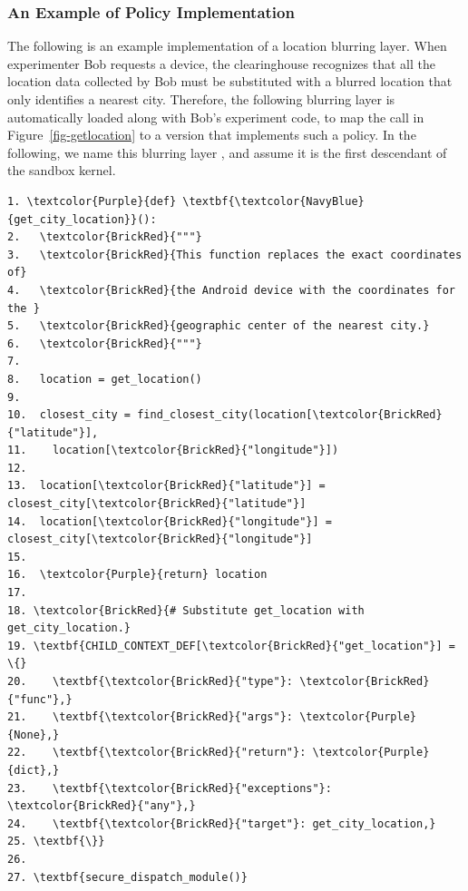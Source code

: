 \subsubsection{An Example of Policy Implementation}
\label{sec-precision-example}


The following is an example implementation of a location blurring layer. 
When experimenter Bob requests a device, the clearinghouse recognizes that all the location data
collected by Bob must be substituted with a blurred location that only identifies a nearest city.
Therefore, the following blurring layer is
automatically loaded along with Bob's experiment code, to map 
the  call in Figure~\ref{fig-getlocation} to a version 
that implements such a policy. In the following, we name this
blurring layer , and assume it is the first descendant
of the sandbox kernel.

\begin{Verbatim}
1. \textcolor{Purple}{def} \textbf{\textcolor{NavyBlue}{get_city_location}}():
2.   \textcolor{BrickRed}{"""}
3.   \textcolor{BrickRed}{This function replaces the exact coordinates of} 
4.   \textcolor{BrickRed}{the Android device with the coordinates for the } 
5.   \textcolor{BrickRed}{geographic center of the nearest city.}
6.   \textcolor{BrickRed}{"""}
7.
8.   location = get_location()
9.
10.  closest_city = find_closest_city(location[\textcolor{BrickRed}{"latitude"}],
11.    location[\textcolor{BrickRed}{"longitude"}])
12.
13.  location[\textcolor{BrickRed}{"latitude"}] = closest_city[\textcolor{BrickRed}{"latitude"}]
14.  location[\textcolor{BrickRed}{"longitude"}] = closest_city[\textcolor{BrickRed}{"longitude"}]
15.
16.  \textcolor{Purple}{return} location
17.
18. \textcolor{BrickRed}{# Substitute get_location with get_city_location.}
19. \textbf{CHILD_CONTEXT_DEF[\textcolor{BrickRed}{"get_location"}] = \{}
20.    \textbf{\textcolor{BrickRed}{"type"}: \textcolor{BrickRed}{"func"},}
21.    \textbf{\textcolor{BrickRed}{"args"}: \textcolor{Purple}{None},}
22.    \textbf{\textcolor{BrickRed}{"return"}: \textcolor{Purple}{dict},}
23.    \textbf{\textcolor{BrickRed}{"exceptions"}: \textcolor{BrickRed}{"any"},}
24.    \textbf{\textcolor{BrickRed}{"target"}: get_city_location,}
25. \textbf{\}}
26.
27. \textbf{secure_dispatch_module()}
\end{Verbatim}


